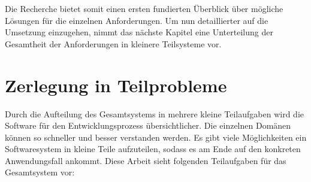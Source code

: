 Die Recherche bietet somit einen ersten fundierten Überblick über mögliche
Lösungen für die einzelnen Anforderungen. Um nun detaillierter auf die Umsetzung
einzugehen, nimmt das nächste Kapitel eine Unterteilung der Gesamtheit der
Anforderungen in kleinere Teilsysteme vor.

\section{Zerlegung in Teilprobleme}
\label{sec_zerlegung_in_teilprobleme} Durch die Aufteilung des Gesamtsystems in
mehrere kleine Teilaufgaben wird die Software für den Entwicklungsprozess
übersichtlicher. Die einzelnen Domänen können so schneller und besser verstanden
werden. Es gibt viele Möglichkeiten ein Softwaresystem in kleine Teile
aufzuteilen, sodass es am Ende auf den konkreten Anwendungsfall ankommt. Diese
Arbeit sieht folgenden Teilaufgaben für das Gesamtsystem vor:

